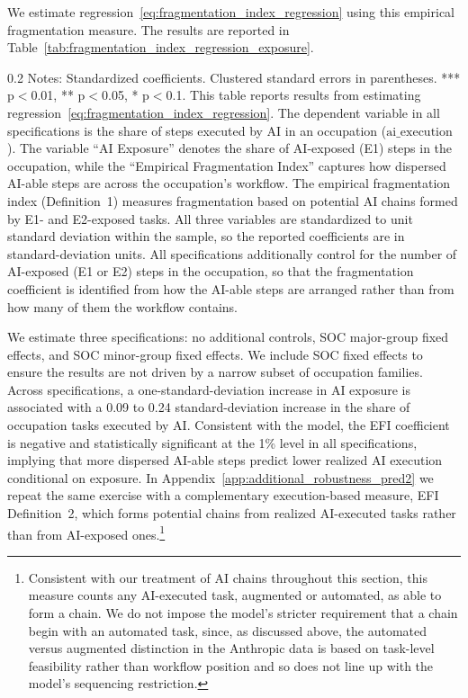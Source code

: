 We estimate regression~\eqref{eq:fragmentation_index_regression} using this empirical fragmentation measure.
The results are reported in Table~\ref{tab:fragmentation_index_regression_exposure}.
\begin{table}[!t]
    \caption{Role of AI-able Task Fragmentation in Determining AI Execution Outcomes}
    \label{tab:fragmentation_index_regression_exposure}
    \footnotesize
    \centering
    
    \begin{minipage}{1\linewidth}
\begin{spacing}{0.2}
{\fontsize{9.5pt}{10pt}\selectfont Notes: Standardized coefficients. Clustered standard errors in parentheses. *** p$<$0.01, ** p$<$0.05, * p$<$0.1.
This table reports results from estimating regression~\eqref{eq:fragmentation_index_regression}.
The dependent variable in all specifications is the share of steps executed by AI in an occupation ($\text{ai\_execution}$).
The variable ``AI Exposure'' denotes the share of AI-exposed (E1) steps in the occupation, while the ``Empirical Fragmentation Index'' captures how dispersed AI-able steps are across the occupation's workflow.
The empirical fragmentation index (Definition~1) measures fragmentation based on potential AI chains formed by E1- and E2-exposed tasks.
All three variables are standardized to unit standard deviation within the sample, so the reported coefficients are in standard-deviation units. All specifications additionally control for the number of AI-exposed (E1 or E2) steps in the occupation, so that the fragmentation coefficient is identified from how the AI-able steps are arranged rather than from how many of them the workflow contains.}
\end{spacing}
\end{minipage}\end{table}
We estimate three specifications: no additional controls, SOC major-group fixed effects, and SOC minor-group fixed effects.
We include SOC fixed effects to ensure the results are not driven by a narrow subset of occupation families.
Across specifications, a one-standard-deviation increase in AI exposure is associated with a 0.09 to 0.24 standard-deviation increase in the share of occupation tasks executed by AI.
Consistent with the model, the EFI coefficient is negative and statistically significant at the 1\% level in all specifications, implying that more dispersed AI-able steps predict lower realized AI execution conditional on exposure.
In Appendix~\ref{app:additional_robustness_pred2} we repeat the same exercise with a complementary execution-based measure, EFI Definition~2, which forms potential chains from realized AI-executed tasks rather than from AI-exposed ones.\footnote{
Consistent with our treatment of AI chains throughout this section, this measure counts any AI-executed task, augmented or automated, as able to form a chain.
We do not impose the model's stricter requirement that a chain begin with an automated task, since, as discussed above, the automated versus augmented distinction in the Anthropic data is based on task-level feasibility rather than workflow position and so does not line up with the model's sequencing restriction.
}
